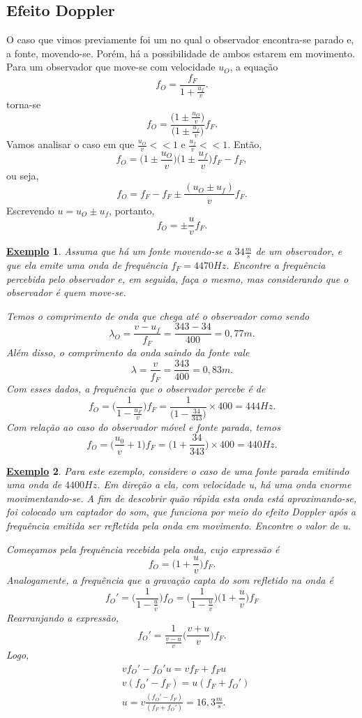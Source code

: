\documentclass{article}
\newtheorem{example}{\underline{Exemplo}}
\begin{document}
\subsection{Efeito Doppler}
O caso que vimos previamente foi um no qual o observador encontra-se parado e, a fonte, movendo-se. Porém, há a possibilidade de ambos estarem em movimento. Para um observador que 
move-se com velocidade \(u_{O}\), a equação 
\[
  f_{O} = \frac{f_{F}}{1+\frac{u_{f}}{v}}.
\]
torna-se 
\[
  f_{O} = \frac{\biggl(1\pm \frac{u_{O}}{v}\biggr)}{\biggl(1\pm \frac{u_{f}}{v}\biggr)}f_{F}.
\]
Vamos analisar o caso em que \(\frac{u_{O}}{v} << 1\) e \(\frac{u_{f}}{v} << 1\). Então, 
\[
  f_{O} = \biggl(1\pm \frac{u_{O}}{v}\biggr)\biggl(1\pm \frac{u_{f}}{v}\biggr)f_{F} - f_{F},
\]
ou seja, 
\[
  f_{O} = f_{F} - f_{F}\pm \frac{(u_{O}\pm u_{f})}{v}f_{F}.
\]
Escrevendo \(u = u_{O} \pm u_{f}\), portanto, 
\[
  f_{O} = \pm\frac{u}{v}f_{F}.
\]
\begin{example}
  Assuma que há um fonte movendo-se a \(34 \frac{m}{s}\) de um observador, e que ela emite uma onda de frequência \(f_{F} = 4470Hz\). Encontre a frequência percebida pelo
  observador e, em seguida, faça o mesmo, mas considerando que o observador é quem move-se.

  Temos o comprimento de onda que chega até o observador como sendo
  \[
    \lambda_{O} = \frac{v-u_{f}}{f_{F}} = \frac{343-34}{400} = 0,77m.
  \]
  Além disso, o comprimento da onda saindo da fonte vale 
  \[
    \lambda = \frac{v}{f_{F}} = \frac{343}{400} = 0,83m.
  \]
  Com esses dados, a frequência que o observador percebe é de 
  \[
    f_{O} = \biggl(\frac{1}{1-\frac{u_{F}}{v}}\biggr)f_{F} = \frac{1}{\biggl(1-\frac{34}{343}\biggr)}\times 400 = 444Hz.
  \]
  Com relação ao caso do observador móvel e fonte parada, temos 
  \[
    f_{O} = \biggl(\frac{u_{0}}{v}+1\biggr)f_{F} = \biggl(1 + \frac{34}{343}\biggr)\times 400 = 440Hz.
  \]
\end{example}
\begin{example}
  Para este exemplo, considere o caso de uma fonte parada emitindo uma onda de \(4400Hz\). Em direção a ela, com velocidade u, há uma onda enorme movimentando-se.
  A fim de descobrir quão rápida esta onda está aproximando-se, foi colocado um captador do som, que funciona por meio do efeito Doppler após a frequência emitida ser refletida
  pela onda em movimento. Encontre o valor de u.

  Começamos pela frequência recebida pela onda, cujo expressão é 
  \[
    f_{O} = \biggl(1 + \frac{u}{v}\biggr)f_{F}.
  \]
  Analogamente, a frequência que a gravação capta do som refletido na onda é 
  \[
    f_{O}' = \biggl(\frac{1}{1-\frac{u}{v}}\biggr)f_{O} = \biggl(\frac{1}{1-\frac{u}{v}}\biggr)\biggl(1+\frac{u}{v}\biggr)f_{F}
  \]
  Rearranjando a expressão, 
  \[
    f_{O}' = \frac{1}{\frac{v-u}{v}}\biggl(\frac{v+u}{v}\biggr)f_{F}.
  \]
  Logo,
  \begin{align*}
   &vf_{O}' - f_{O}'u = vf_{F} + f_{F}u\\
   &v(f_{O}' - f_{F}) = u(f_{F}+f_{O}')\\
   &u = v\frac{(f_{O}'-f_{F})}{(f_{F}+f_{O}')} = 16,3 \frac{m}{s}.
  \end{align*}
\end{example}
\newpage
\end{document}
